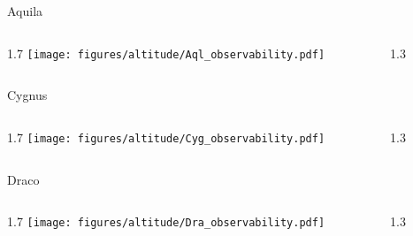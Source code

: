 \documentclass[final]{beamer}
\newlength{\colwidth}
\begin{document}
\begin{frame}[t]{}
  \Large{Aquila}
  \begin{columns}[T]
    \begin{column}{1.7\colwidth}
      \centering
      \texttt{[image: figures/altitude/Aql\_observability.pdf]}
    \end{column}
    \begin{column}{1.3\colwidth}
      \Large
      
    \end{column}
  \end{columns}

  \Large{Cygnus}
  \begin{columns}[T]
    \begin{column}{1.7\colwidth}
      \centering
      \texttt{[image: figures/altitude/Cyg\_observability.pdf]}
    \end{column}
    \begin{column}{1.3\colwidth}
      \Large
      
    \end{column}
  \end{columns}

  \Large{Draco}
  \begin{columns}[T]
    \begin{column}{1.7\colwidth}
      \centering
      \texttt{[image: figures/altitude/Dra\_observability.pdf]}
    \end{column}
    \begin{column}{1.3\colwidth}
      \Large
      
    \end{column}
  \end{columns}
\end{frame}

\end{document}
